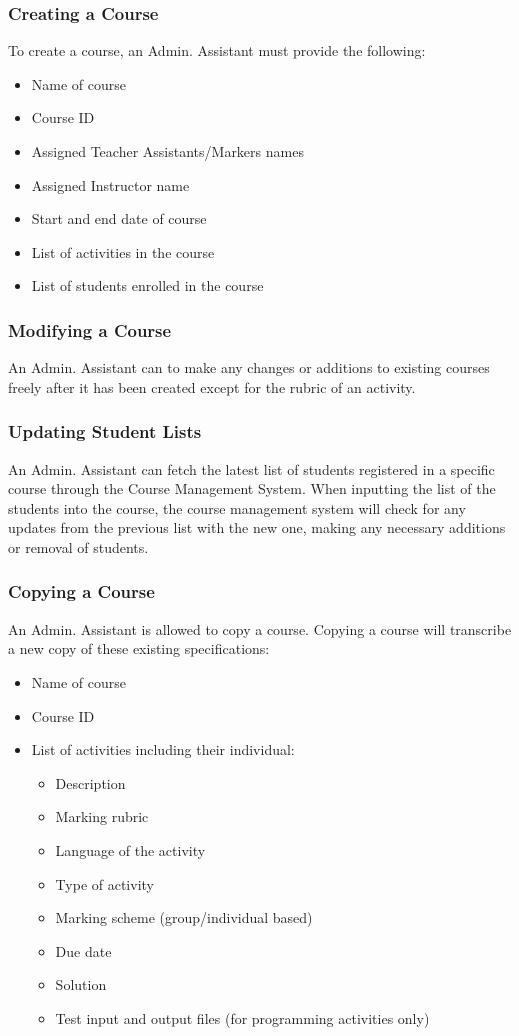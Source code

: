 \documentclass{article}
\begin{document}
\subsubsection{Creating a Course}
To create a course, an Admin. Assistant must provide the following:
\begin{itemize}
	\item Name of course
	\item Course ID
	\item Assigned Teacher Assistants/Markers names
	\item Assigned Instructor name
	\item Start and end date of course
	\item List of activities in the course
	\item List of students enrolled in the course
\end{itemize}
\subsubsection{Modifying a Course}
An Admin. Assistant can to make any changes or additions to existing courses
freely after it has been created except for the rubric of an activity.
\subsubsection{Updating Student Lists}
An Admin. Assistant can fetch the latest list of students registered in a
specific course through the Course Management System.
When inputting the list of the students into the course, the course management
system will check for any updates from the previous list with the new one,
making any necessary additions or removal of students.
\subsubsection{Copying a Course}
An Admin. Assistant is allowed to copy a course. Copying a course will transcribe a new copy of these existing specifications:
\begin{itemize}
  \item Name of course
  \item Course ID
  \item List of activities including their individual:
    \begin{itemize}
    \item Description
    \item Marking rubric
    \item Language of the activity
    \item Type of activity
    \item Marking scheme (group/individual based)
    \item Due date
    \item Solution
    \item Test input and output files (for programming activities only)
    \end {itemize}
\end {itemize}
\end{document}

